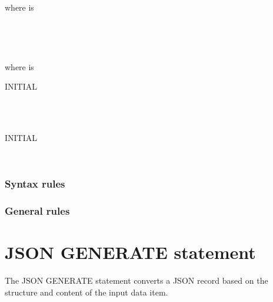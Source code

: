 where  is

\begin{syntax}
  \begin{1=}
    \identifier \\
    \literal
  \end{1=}
  \begin{1=}
    \identifier \\
    \literal
  \end{1=}
  \begin{0-1}
  \end{0-1}
\end{syntax}

where  is

\begin{syntax}
  \begin{0+}
     INITIAL
    \begin{1=}
      \identifier \\
      \literal
    \end{1=} \\

     INITIAL
    \begin{1=}
      \identifier \\
      \literal
    \end{1=}
  \end{0+}
\end{syntax}

\subsubsection{Syntax rules}

\subsubsection{General rules}

\section{JSON GENERATE statement}

The JSON GENERATE statement converts a JSON record based on the structure and content of the input data item.

